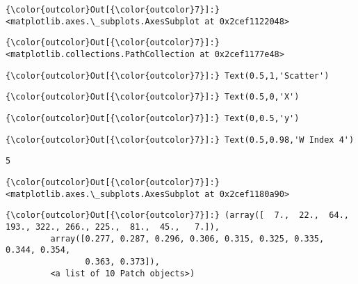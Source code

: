 \documentclass[11pt]{article}
\begin{document}
\begin{Verbatim}[commandchars=\\\{\}]
{\color{outcolor}Out[{\color{outcolor}7}]:} <matplotlib.axes.\_subplots.AxesSubplot at 0x2cef1122048>
\end{Verbatim}
            
\begin{Verbatim}[commandchars=\\\{\}]
{\color{outcolor}Out[{\color{outcolor}7}]:} <matplotlib.collections.PathCollection at 0x2cef1177e48>
\end{Verbatim}
            
\begin{Verbatim}[commandchars=\\\{\}]
{\color{outcolor}Out[{\color{outcolor}7}]:} Text(0.5,1,'Scatter')
\end{Verbatim}
            
\begin{Verbatim}[commandchars=\\\{\}]
{\color{outcolor}Out[{\color{outcolor}7}]:} Text(0.5,0,'X')
\end{Verbatim}
            
\begin{Verbatim}[commandchars=\\\{\}]
{\color{outcolor}Out[{\color{outcolor}7}]:} Text(0,0.5,'y')
\end{Verbatim}
            
\begin{Verbatim}[commandchars=\\\{\}]
{\color{outcolor}Out[{\color{outcolor}7}]:} Text(0.5,0.98,'W Index 4')
\end{Verbatim}
            
    \begin{Verbatim}[commandchars=\\\{\}]
5

    \end{Verbatim}

\begin{Verbatim}[commandchars=\\\{\}]
{\color{outcolor}Out[{\color{outcolor}7}]:} <matplotlib.axes.\_subplots.AxesSubplot at 0x2cef1180a90>
\end{Verbatim}
            
\begin{Verbatim}[commandchars=\\\{\}]
{\color{outcolor}Out[{\color{outcolor}7}]:} (array([  7.,  22.,  64., 193., 322., 266., 225.,  81.,  45.,   7.]),
         array([0.277, 0.287, 0.296, 0.306, 0.315, 0.325, 0.335, 0.344, 0.354,
                0.363, 0.373]),
         <a list of 10 Patch objects>)
\end{Verbatim}
            
\end{document}
